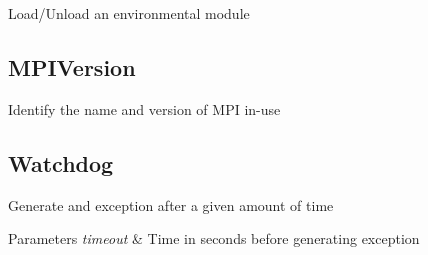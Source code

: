 Load/\-Unload an environmental module\hypertarget{group__Utilities_MPIVersion}{}\subsection{M\-P\-I\-Version}\label{group__Utilities_MPIVersion}
Identify the name and version of M\-P\-I in-\/use\hypertarget{group__Utilities_Watchdog}{}\subsection{Watchdog}\label{group__Utilities_Watchdog}
Generate and exception after a given amount of time 
\begin{DoxyParams}{Parameters}
{\em timeout} & Time in seconds before generating exception \\
\hline
\end{DoxyParams}
